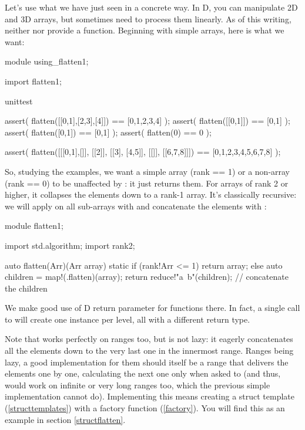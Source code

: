 Let's use what we have just seen in a concrete way. In D, you can manipulate 2D and 3D arrays, but sometimes need to process them linearly. As of this writing, neither  nor  provide a  function. Beginning with simple arrays, here is what we want:

\begin{dcode}
module using_flatten1;

import flatten1;

unittest
{
    assert( flatten([[0,1],[2,3],[4]]) == [0,1,2,3,4] );
    assert( flatten([[0,1]]) == [0,1] );
    assert( flatten([0,1]) == [0,1] );
    assert( flatten(0) == 0 );

    assert( flatten([[[0,1],[]], [[2]], [[3], [4,5]], [[]], [[6,7,8]]])
            == [0,1,2,3,4,5,6,7,8] );
}
\end{dcode}

So, studying the examples, we want a simple array (rank == 1) or a non-array (rank == 0) to be unaffected by : it just returns them. For arrays of rank 2 or higher, it collapses the elements down to a rank-1 array. It's classically recursive: we will apply  on all sub-arrays with  and concatenate the elements with :

\begin{dcode}
module flatten1;

import std.algorithm;
import rank2;

auto flatten(Arr)(Arr array)
{
    static if (rank!Arr <= 1)
        return array;
    else
    {
        auto children = map!(.flatten)(array);
        return reduce!"a~b"(children); // concatenate the children
    }
}
\end{dcode}

We make good use of D  return parameter for functions there. In fact, a single call to  will create one instance per level, all with a different return type. 

Note that  works perfectly on ranges too, but is not lazy: it eagerly concatenates all the elements down to the very last one in the innermost range. Ranges being lazy, a good  implementation for them should itself be a range that delivers the elements one by one, calculating the next one only when asked to (and thus, would work on infinite or very long ranges too, which the previous simple implementation cannot do). Implementing this means creating a struct template (\ref{structtemplates}) with a factory function (\ref{factory}). You will find this as an example in section \ref{structflatten}.

